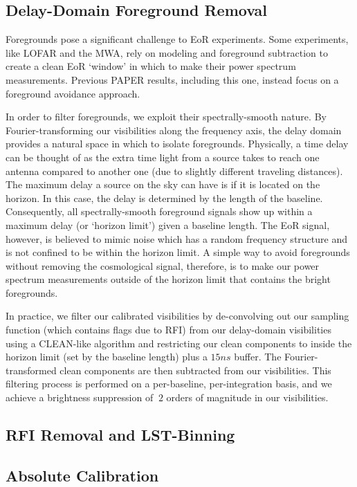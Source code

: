 \documentclass[preprint2,numberedappendix,tighten,twocolappendix]{aastex6}  %
\begin{document}
\subsection{Delay-Domain Foreground Removal}

Foregrounds pose a significant challenge to EoR experiments. Some experiments, like LOFAR and the MWA, rely on modeling and foreground subtraction to create a clean EoR `window' in which to make their power spectrum measurements. Previous PAPER results, including this one, instead focus on a foreground avoidance approach. 

In order to filter foregrounds, we exploit their spectrally-smooth nature. By Fourier-transforming our visibilities along the frequency axis, the delay domain provides a natural space in which to isolate foregrounds. Physically, a time delay can be thought of as the extra time light from a source takes to reach one antenna compared to another one (due to slightly different traveling distances). The maximum delay a source on the sky can have is if it is located on the horizon. In this case, the delay is determined by the length of the baseline. Consequently, all spectrally-smooth foreground signals show up within a maximum delay (or `horizon limit') given a baseline length. The EoR signal, however, is believed to mimic noise which has a random frequency structure and is not confined to be within the horizon limit. A simple way to avoid foregrounds without removing the cosmological signal, therefore, is to make our power spectrum measurements outside of the horizon limit that contains the bright foregrounds. 

In practice, we filter our calibrated visibilities by de-convolving out our sampling function (which contains flags due to RFI) from our delay-domain visibilities using a CLEAN-like algorithm and restricting our clean components to inside the horizon limit (set by the baseline length) plus a $15 ns$ buffer. The Fourier-transformed clean components are then subtracted from our visibilities. This filtering process is performed on a per-baseline, per-integration basis, and we achieve a brightness suppression of $~2$ orders of magnitude in our visibilities. 

\subsection{RFI Removal and LST-Binning}

\subsection{Absolute Calibration}
\end{document}
